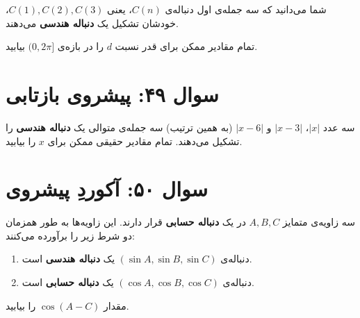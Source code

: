 \documentclass[12pt]{article}
\begin{document}
	شما می‌دانید که سه جمله‌ی اول دنباله‌ی \(C(n)\)، یعنی \(C(1), C(2), C(3)\)، خودشان تشکیل یک \textbf{دنباله هندسی} می‌دهند.
	\vspace{0.5cm}
	
	تمام مقادیر ممکن برای قدر نسبت \(d\) را در بازه‌ی \( (0, 2\pi] \) بیابید.
	
	\vspace{1cm}
	\hrulefill
	\vspace{1cm}
	
	\section*{سوال ۴۹: پیشروی بازتابی }
	سه عدد \(|x|\)، \(|x - 3|\) و \(|x - 6|\) (به همین ترتیب) سه جمله‌ی متوالی یک \textbf{دنباله هندسی} را تشکیل می‌دهند. تمام مقادیر حقیقی ممکن برای \(x\) را بیابید.
	
	\vspace{1cm}
	\hrulefill
	\vspace{1cm}
	
	\section*{سوال ۵۰: آکوردِ پیشروی }
	سه زاویه‌ی متمایز \(A, B, C\) در یک \textbf{دنباله حسابی} قرار دارند. این زاویه‌ها به طور همزمان دو شرط زیر را برآورده می‌کنند:
	\begin{enumerate}[label=(\roman*)]
		\item دنباله‌ی \((\sin A, \sin B, \sin C)\) یک \textbf{دنباله هندسی} است.
		\item دنباله‌ی \((\cos A, \cos B, \cos C)\) یک \textbf{دنباله حسابی} است.
	\end{enumerate}
	\vspace{0.5cm}
	
	مقدار \( \cos(A-C) \) را بیابید.
	
	\vspace{1cm}
	\hrulefill
	\vspace{1cm}
	
\end{document}
